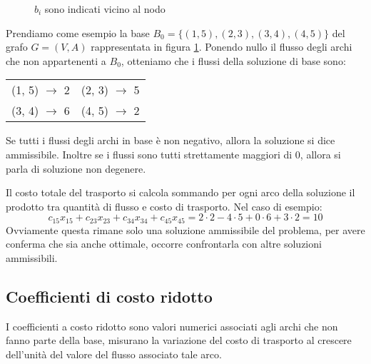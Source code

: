 \documentclass[../template]{subfiles}
\begin{document}
\begin{figure}[h]
    \centering
    \caption{$b_i$ sono indicati vicino al nodo}
    \label{img:infty_flux}
\end{figure}
Prendiamo come esempio la base $B_0 = \{(1, 5), (2, 3), (3, 4), (4, 5)\}$ del grafo $G = (V, A)$
rappresentata in figura \ref{img:infty_flux}.
Ponendo nullo il flusso degli archi che non appartenenti a $B_0$, otteniamo che i flussi della soluzione di base sono:

\begin{table}[h]
    \centering
    \setlength{\tabcolsep}{2em}
    \begin{tabular}{cc}
        (1, 5) $\to$ 2 & (2, 3) $\to$ 5\\
        (3, 4) $\to$ 6 & (4, 5) $\to$ 2
    \end{tabular}
\end{table}
Se tutti i flussi degli archi in base è non negativo, allora la soluzione si dice ammissibile.
Inoltre se i flussi sono tutti strettamente maggiori di 0, allora si parla di soluzione non degenere.

Il costo totale del trasporto si calcola sommando per ogni arco della soluzione il prodotto tra quantità di flusso e
costo di trasporto.
Nel caso di esempio:
\[
    c_{15} x_{15} + c_{23} x_{23} + c_{34} x_{34} + c_{45} x_{45} =
    2 \cdot 2 - 4 \cdot 5 + 0 \cdot 6 + 3 \cdot 2 = 10
\]
Ovviamente questa rimane solo una soluzione ammissibile del problema, per avere conferma che sia anche ottimale, occorre
confrontarla con altre soluzioni ammissibili.

\subsection{Coefficienti di costo ridotto}
I coefficienti a costo ridotto sono valori numerici associati agli archi che non fanno parte della
base, misurano la variazione del costo di trasporto al crescere dell'unità del valore del flusso
associato tale arco.
\end{document}
